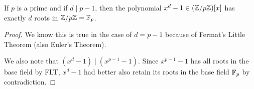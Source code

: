 \begin{proposition}[4.1.2 of text]
    If $p$ is a prime and if $d\mid p-1$, then the polynomial $x^d - 1\in (\mathbb Z/p\mathbb Z)[x]$ has exactly $d$ roots in $\mathbb Z/p\mathbb Z = \mathbb F_p$. 
\end{proposition}
\begin{proof}
    We know this is true in the case of $d = p-1$ because of Fermat's Little Theorem (also Euler's Theorem). 

    We also note that $(x^d - 1)\mid (x^{p-1} - 1)$. Since $x^{p-1} - 1$ has all roots in the base field by FLT, $x^d - 1$ had better also retain its roots in the base field $\mathbb F_p$ by contradiction. 
\end{proof}